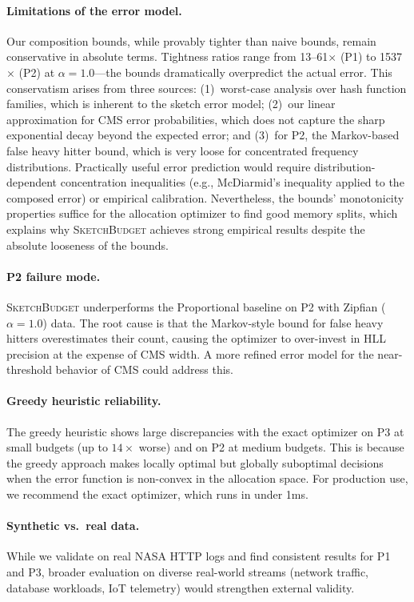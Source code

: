 \documentclass[preprint]{article}
\newcommand{\SketchBudget}{\textsc{SketchBudget}}
\begin{document}
\paragraph{Limitations of the error model.}
Our composition bounds, while provably tighter than naive bounds, remain conservative in absolute terms. Tightness ratios range from 13--61$\times$ (P1) to 1537$\times$ (P2) at $\alpha=1.0$---the bounds dramatically overpredict the actual error. This conservatism arises from three sources: (1)~worst-case analysis over hash function families, which is inherent to the sketch error model; (2)~our linear approximation for CMS error probabilities, which does not capture the sharp exponential decay beyond the expected error; and (3)~for P2, the Markov-based false heavy hitter bound, which is very loose for concentrated frequency distributions. Practically useful error prediction would require distribution-dependent concentration inequalities (e.g., McDiarmid's inequality applied to the composed error) or empirical calibration. Nevertheless, the bounds' monotonicity properties suffice for the allocation optimizer to find good memory splits, which explains why \SketchBudget{} achieves strong empirical results despite the absolute looseness of the bounds.

\paragraph{P2 failure mode.}
\SketchBudget{} underperforms the Proportional baseline on P2 with Zipfian ($\alpha=1.0$) data. The root cause is that the Markov-style bound for false heavy hitters overestimates their count, causing the optimizer to over-invest in HLL precision at the expense of CMS width. A more refined error model for the near-threshold behavior of CMS could address this.

\paragraph{Greedy heuristic reliability.}
The greedy heuristic shows large discrepancies with the exact optimizer on P3 at small budgets (up to $14\times$ worse) and on P2 at medium budgets. This is because the greedy approach makes locally optimal but globally suboptimal decisions when the error function is non-convex in the allocation space. For production use, we recommend the exact optimizer, which runs in under 1ms.

\paragraph{Synthetic vs.\ real data.}
While we validate on real NASA HTTP logs and find consistent results for P1 and P3, broader evaluation on diverse real-world streams (network traffic, database workloads, IoT telemetry) would strengthen external validity.
\end{document}
